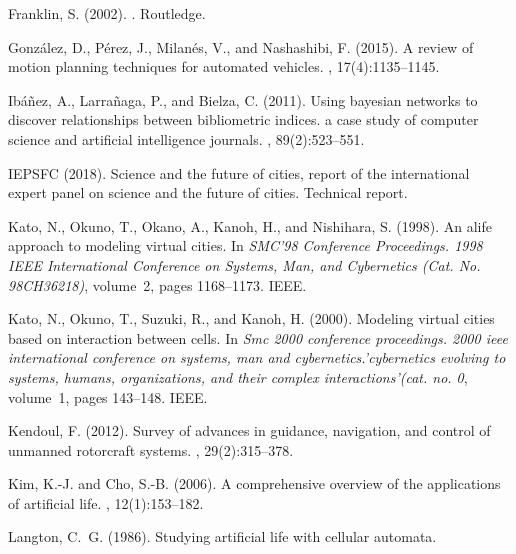 \documentclass[letterpaper]{article}
\begin{document}
\begin{thebibliography}{}
Franklin, S. (2002).
.
\newblock Routledge.

Gonz{\'a}lez, D., P{\'e}rez, J., Milan{\'e}s, V., and Nashashibi, F. (2015).
\newblock A review of motion planning techniques for automated vehicles.
,
  17(4):1135--1145.

Ib{\'a}{\~n}ez, A., Larra{\~n}aga, P., and Bielza, C. (2011).
\newblock Using bayesian networks to discover relationships between
  bibliometric indices. a case study of computer science and artificial
  intelligence journals.
, 89(2):523--551.

IEPSFC (2018).
\newblock Science and the future of cities, report of the international expert
  panel on science and the future of cities.
\newblock Technical report.

Kato, N., Okuno, T., Okano, A., Kanoh, H., and Nishihara, S. (1998).
\newblock An alife approach to modeling virtual cities.
\newblock In {\em SMC'98 Conference Proceedings. 1998 IEEE International
  Conference on Systems, Man, and Cybernetics (Cat. No. 98CH36218)}, volume~2,
  pages 1168--1173. IEEE.

Kato, N., Okuno, T., Suzuki, R., and Kanoh, H. (2000).
\newblock Modeling virtual cities based on interaction between cells.
\newblock In {\em Smc 2000 conference proceedings. 2000 ieee international
  conference on systems, man and cybernetics.'cybernetics evolving to systems,
  humans, organizations, and their complex interactions'(cat. no. 0}, volume~1,
  pages 143--148. IEEE.

Kendoul, F. (2012).
\newblock Survey of advances in guidance, navigation, and control of unmanned
  rotorcraft systems.
, 29(2):315--378.

Kim, K.-J. and Cho, S.-B. (2006).
\newblock A comprehensive overview of the applications of artificial life.
, 12(1):153--182.

Langton, C.~G. (1986).
\newblock Studying artificial life with cellular automata.


\end{thebibliography}
\end{document}
